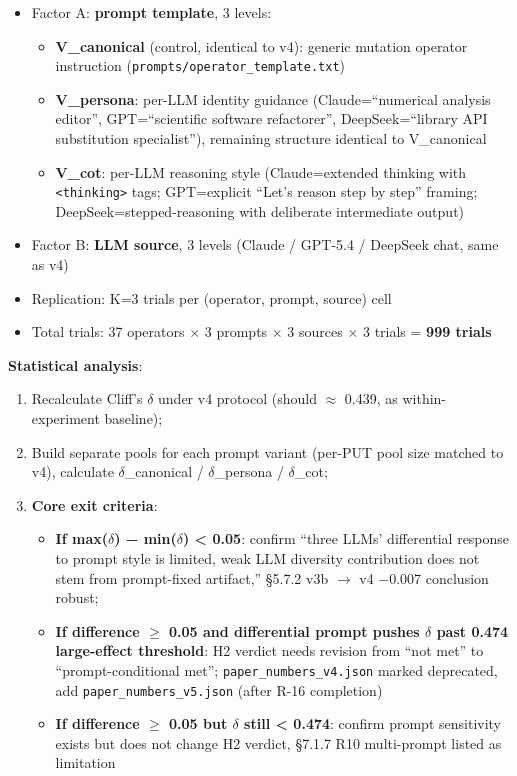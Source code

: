 \documentclass[review,12pt,authoryear]{elsarticle}
\providecommand{\tightlist}{\setlength{\itemsep}{0pt}\setlength{\parskip}{0pt}}
\begin{document}
\begin{itemize}
\tightlist
\item
  Factor A: \textbf{prompt template}, 3 levels:

  \begin{itemize}
  \tightlist
  \item
    \textbf{V\_canonical} (control, identical to v4): generic mutation
    operator instruction (\texttt{prompts/operator\_template.txt})
  \item
    \textbf{V\_persona}: per-LLM identity guidance (Claude=``numerical
    analysis editor'', GPT=``scientific software refactorer'',
    DeepSeek=``library API substitution specialist''), remaining
    structure identical to V\_canonical
  \item
    \textbf{V\_cot}: per-LLM reasoning style (Claude=extended thinking
    with \texttt{\textless{}thinking\textgreater{}} tags; GPT=explicit
    ``Let's reason step by step'' framing; DeepSeek=stepped-reasoning
    with deliberate intermediate output)
  \end{itemize}
\item
  Factor B: \textbf{LLM source}, 3 levels (Claude / GPT-5.4 / DeepSeek
  chat, same as v4)
\item
  Replication: K=3 trials per (operator, prompt, source) cell
\item
  Total trials: 37 operators $\times$ 3 prompts $\times$ 3 sources $\times$ 3 trials =
  \textbf{999 trials}
\end{itemize}

\textbf{Statistical analysis}:

\begin{enumerate}
\def\labelenumi{\arabic{enumi}.}
\tightlist
\item
  Recalculate Cliff's $\delta$ under v4 protocol (should $\approx$ 0.439, as
  within-experiment baseline);
\item
  Build separate pools for each prompt variant (per-PUT pool size
  matched to v4), calculate $\delta$\_canonical / $\delta$\_persona / $\delta$\_cot;
\item
  \textbf{Core exit criteria}:

  \begin{itemize}
  \tightlist
  \item
    \textbf{If max($\delta$) − min($\delta$) \textless{} 0.05}: confirm ``three LLMs'
    differential response to prompt style is limited, weak LLM diversity
    contribution does not stem from prompt-fixed artifact,'' §5.7.2 v3b
    $\to$ v4 −0.007 conclusion robust;
  \item
    \textbf{If difference $\geq$ 0.05 and differential prompt pushes $\delta$ past
    0.474 large-effect threshold}: H2 verdict needs revision from ``not
    met'' to ``prompt-conditional met'';
    \texttt{paper\_numbers\_v4.json} marked deprecated, add
    \texttt{paper\_numbers\_v5.json} (after R-16 completion)
  \item
    \textbf{If difference $\geq$ 0.05 but $\delta$ still \textless{} 0.474}: confirm
    prompt sensitivity exists but does not change H2 verdict, §7.1.7 R10
    multi-prompt listed as limitation
  \end{itemize}
\end{enumerate}
\end{document}

